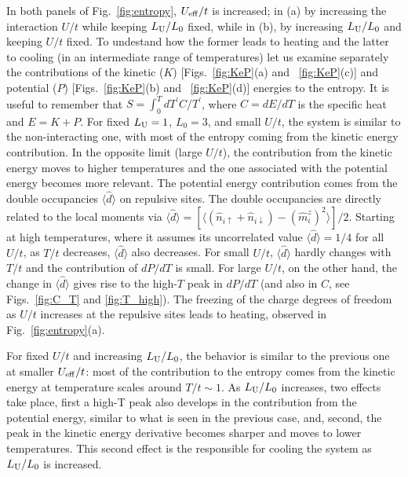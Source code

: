 \documentclass[aps,pra,reprint,twocolumn,showpacs,longbibliography,superscriptaddress]{revtex4-1}
\begin{document}
In both panels of Fig.~\ref{fig:entropy}, $U_{\rm eff}/t$ is increased; in (a) by increasing the interaction $U/t$ while keeping $L_{\rm U}/L_0$ fixed, while in (b), by increasing $L_{\rm U}/L_0$ and keeping $U/t$ fixed.  To undestand how the former leads to heating and the latter to cooling (in an intermediate range of temperatures) let us examine separately the contributions of the kinetic ($K$) [Figs.~\ref{fig:KeP}(a) and ~\ref{fig:KeP}(c)] and potential ($P$) [Figs.~\ref{fig:KeP}(b) and ~\ref{fig:KeP}(d)] energies to the entropy. It is useful to remember that $S = \int_0^T dT^\prime C/T^\prime $, where $C=dE/dT$ is the specific heat and $E=K+P$. For fixed $L_{\rm U}=1$, $L_0=3$, and small $U/t$, the system is similar to the non-interacting one, with most of the entropy coming from the kinetic energy contribution. In the opposite limit (large $U/t$), the contribution from the kinetic energy moves to higher temperatures and the one associated with the potential energy becomes more relevant. The potential energy contribution comes from the double occupancies $\langle \hat d\rangle$ on repulsive sites. The double occupancies are directly related to the local moments via $\langle \hat d\rangle = [\langle\left( \hat n_{i\uparrow} + \hat n_{i\downarrow}\right)-(\hat m_{i}^z)^2\rangle]/2$. Starting at high temperatures, where it assumes its uncorrelated value $\langle \hat d\rangle=1/4$ for all $U/t$, as $T/t$ decreases, $\langle \hat d\rangle$ also decreases. For small $U/t$, $\langle \hat d\rangle$ hardly changes with $T/t$ and the contribution of $dP/dT$ is small. For large $U/t$, on the other hand, the change in  $\langle \hat d\rangle$ gives rise to the high-$T$ peak in $dP/dT$ (and also in $C$, see Figs.~\ref{fig:C_T} and \ref{fig:T_high}). The freezing of the charge degrees of freedom as $U/t$ increases at the repulsive sites leads to heating, observed in Fig.~\ref{fig:entropy}(a). 

For fixed $U/t$ and increasing $L_{\rm U}/L_0$, the behavior is similar to the previous one  at smaller $U_{\rm eff}/t$: most of the contribution to the entropy comes from the kinetic energy at temperature scales around $T/t \sim 1$.
As $L_{\rm U}/L_0$ increases, two effects take place, first  a high-T peak also develops in the contribution from the potential energy, similar to what is seen in the previous case, and, second, the peak in the kinetic energy derivative becomes sharper and moves to lower temperatures. This second effect is the responsible for cooling the system as $L_{\rm U}/L_0$ is increased.
\end{document}
